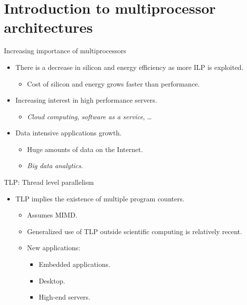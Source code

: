 \section{Introduction to multiprocessor architectures}

\begin{frame}[t]{Increasing importance of multiprocessors}
\begin{itemize}
  \item There is a decrease in silicon and energy efficiency as more ILP is exploited.
    \begin{itemize}
      \item Cost of silicon and energy grows faster than performance.
    \end{itemize}

  \item Increasing interest in high performance servers.
    \begin{itemize}
      \item \emph{Cloud computing}, \emph{software as a service}, \ldots
    \end{itemize}

  \item Data intensive applications growth.
    \begin{itemize}
      \item Huge amounts of data on the Internet.
      \item \emph{Big data analytics}.
    \end{itemize}

\end{itemize}
\end{frame}

\begin{frame}[t]{TLP: Thread level parallelism}
\begin{itemize}
  \item TLP implies the existence of multiple program counters.

    \begin{itemize}
      \item Assumes MIMD.

      \item Generalized use of TLP outside scientific computing is relatively recent.

      \item New applications:
        \begin{itemize}
          \item Embedded applications.
          \item Desktop.
          \item High-end servers.
        \end{itemize}
    \end{itemize}
\end{itemize}
\end{frame}

